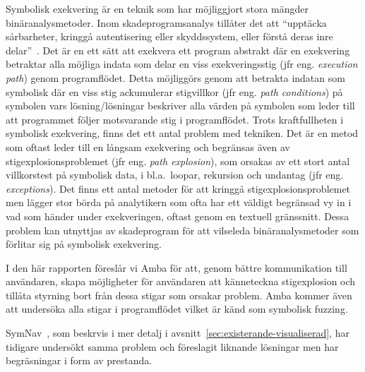 Symbolisk exekvering är en teknik som har möjliggjort stora mängder binäranalysmetoder\cite{survey_symb_exc, symnav}.
Inom skadeprogramsanalys tillåter det att ``upptäcka sårbarheter, kringgå autentisering eller skyddssystem, eller förstå deras inre delar''~\cite{symnav}.
Det är en ett sätt att exekvera ett program abstrakt där en exekvering betraktar alla möjliga indata som delar en viss exekveringsstig (jfr eng. \emph{execution path}) genom programflödet.
Detta möjliggörs genom att betrakta indatan som symbolisk där en viss stig ackumulerar stigvillkor (jfr eng. \emph{path conditions}) på symbolen vars lösning/lösningar beskriver alla värden på symbolen som leder till att programmet följer motsvarande stig i programflödet.
Trots kraftfullheten i symbolisk exekvering, finns det ett antal problem med tekniken.
Det är en metod som oftast leder till en långsam exekvering och begränsas även av stigexplosionsproblemet (jfr eng. \emph{path explosion}), som orsakas av ett stort antal villkorstest på symbolisk data, i bl.a.\ loopar, rekursion och undantag (jfr eng. \emph{exceptions}).
Det finns ett antal metoder för att kringgå stigexplosionsproblemet men lägger stor börda på analytikern som ofta har ett väldigt begränsad vy in i vad som händer under exekveringen, oftast genom en textuell gränssnitt.
Dessa problem kan utnyttjas av skadeprogram för att vilseleda binäranalysmetoder som förlitar sig på symbolisk exekvering.

I den här rapporten föreslår vi Amba för att, genom bättre kommunikation till användaren, skapa möjligheter för användaren att känneteckna stigexplosion och tillåta styrning bort från dessa stigar som orsakar problem. Amba kommer även att undersöka alla stigar i programflödet vilket är känd som symbolisk fuzzing.

SymNav~\cite{symnav}, som beskrvis i mer detalj i avsnitt~\ref{sec:existerande-visualiserad}, har tidigare undersökt samma problem och föreslagit liknande lösningar men har begräsningar i form av prestanda.
